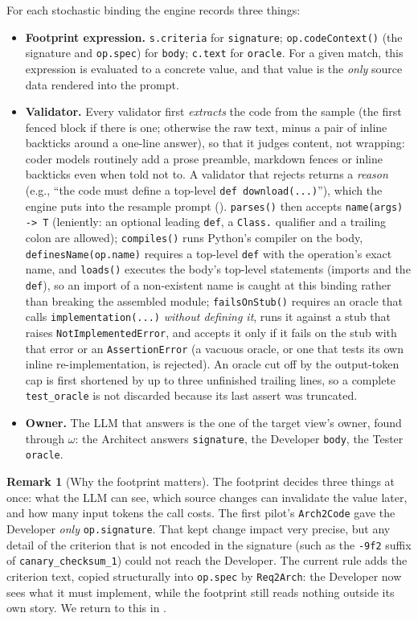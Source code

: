 \documentclass[10pt,a4paper]{article}
\newcommand{\code}[1]{\texttt{#1}}
\theoremstyle{definition}
\newtheorem{remark}{Remark}
\begin{document}
For each stochastic binding the engine records three things:

\begin{itemize}[nosep]
\item \textbf{Footprint expression.} \code{s.criteria} for \code{signature};
\code{op.codeContext()} (the signature and \code{op.spec}) for \code{body};
\code{c.text} for \code{oracle}. For a
given match, this expression is evaluated to a concrete value, and that value
is the \emph{only} source data rendered into the prompt.
\item \textbf{Validator.} Every validator first \emph{extracts} the code
from the sample (the first fenced block if there is one; otherwise the raw
text, minus a pair of inline backticks around a one-line answer), so that it
judges content, not wrapping: coder models routinely add a prose preamble,
markdown fences or inline backticks even when told not to. A validator that
rejects returns a \emph{reason} (e.g., ``the code must define a top-level
\code{def download(...)}''), which the engine puts into the resample prompt
(). \code{parses()} then
accepts \code{name(args) -> T} (leniently: an optional leading \code{def},
a \code{Class.} qualifier and a trailing colon are allowed);
\code{compiles()} runs Python's compiler on the body,
\code{definesName(op.name)} requires a top-level \code{def} with the
operation's exact name, and \code{loads()} executes the body's top-level
statements (imports and the \code{def}), so an import of a non-existent name
is caught at this binding rather than breaking the assembled module; \code{failsOnStub()} requires an oracle that calls
\code{implementation(...)} \emph{without defining it}, runs it against a stub
that raises \code{NotImplementedError}, and accepts it only if it fails on
the stub with that error or an \code{AssertionError} (a vacuous oracle, or
one that tests its own inline re-implementation, is rejected). An oracle cut
off by the output-token cap is first shortened by up to three unfinished
trailing lines, so a complete \code{test\_oracle} is not discarded because
its last assert was truncated.
\item \textbf{Owner.} The LLM that answers is the one of the target view's
owner, found through $\omega$: the Architect answers \code{signature}, the
Developer \code{body}, the Tester \code{oracle}.
\end{itemize}

\begin{remark}[Why the footprint matters]
The footprint decides three things at once: what the LLM can see, which
source changes can invalidate the value later, and how many input tokens the
call costs. The first pilot's \code{Arch2Code} gave the Developer \emph{only}
\code{op.signature}. That kept change impact very precise, but any detail of
the criterion that is not encoded in the signature (such as the \code{-9f2}
suffix of \code{canary_checksum_1}) could not reach the Developer. The
current rule adds the criterion text, copied structurally into
\code{op.spec} by \code{Req2Arch}: the Developer now sees what it must
implement, while the footprint still reads nothing outside its own story.
We return to this in .
\end{remark}
\end{document}
